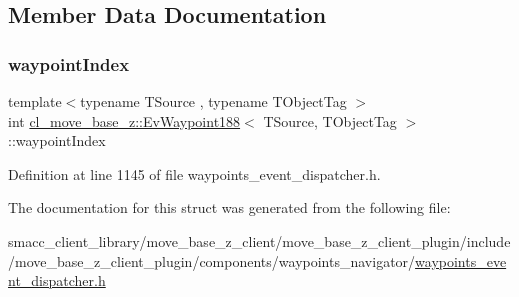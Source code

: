 \subsection{Member Data Documentation}
\mbox{\label{structcl__move__base__z_1_1EvWaypoint188_a3b47f8f6120cd1e6960978e8d18628fb}} 
\subsubsection{\texorpdfstring{waypoint\+Index}{waypointIndex}}
{\footnotesize\ttfamily template$<$typename T\+Source , typename T\+Object\+Tag $>$ \\
int \hyperlink{structcl__move__base__z_1_1EvWaypoint188}{cl\+\_\+move\+\_\+base\+\_\+z\+::\+Ev\+Waypoint188}$<$ T\+Source, T\+Object\+Tag $>$\+::waypoint\+Index}



Definition at line 1145 of file waypoints\+\_\+event\+\_\+dispatcher.\+h.



The documentation for this struct was generated from the following file\+:\begin{DoxyCompactItemize}
\item 
smacc\+\_\+client\+\_\+library/move\+\_\+base\+\_\+z\+\_\+client/move\+\_\+base\+\_\+z\+\_\+client\+\_\+plugin/include/move\+\_\+base\+\_\+z\+\_\+client\+\_\+plugin/components/waypoints\+\_\+navigator/\hyperlink{waypoints__event__dispatcher_8h}{waypoints\+\_\+event\+\_\+dispatcher.\+h}\end{DoxyCompactItemize}
